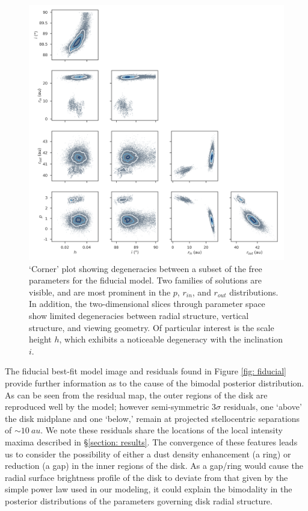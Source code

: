 \documentclass[modern]{aastex62}
\begin{document}
\begin{figure}
  \centering
  \includegraphics[width=\linewidth]{../figures/degeneracy_corner}
  \caption{
  `Corner' plot showing degeneracies between a subset of the free parameters for the fiducial model.
  Two families of solutions are visible, and are most prominent in the $p$, $r_{in}$, and $r_{out}$ distributions.
  In addition, the two-dimensional slices through parameter space show limited degeneracies between radial structure, vertical structure, and viewing geometry.
  Of particular interest is the scale height $h$, which exhibits a noticeable degeneracy with the inclination $i$.
  }
  \label{fig: degeneracies}
\end{figure}

The fiducial best-fit model image and residuals found in Figure \ref{fig: fiducial} provide further information as to the cause of the bimodal posterior distribution.
As can be seen from the residual map, the outer regions of the disk are reproduced well by the model; however semi-symmetric $3\sigma$ residuals, one `above' the disk midplane and one `below,' remain at projected stellocentric separations of $\sim \SI{10}{au}$. 
We note these residuals share the locations of the local intensity maxima described in \S \ref{section: results}. 
The convergence of these features leads us to consider the possibility of either a dust density enhancement (a ring) or reduction (a gap) in the inner regions of the disk. 
As a gap/ring would cause the radial surface brightness profile of the disk to deviate from that given by the simple power law used in our modeling, it could explain the bimodality in the posterior distributions of the parameters governing disk radial structure.
\end{document}
